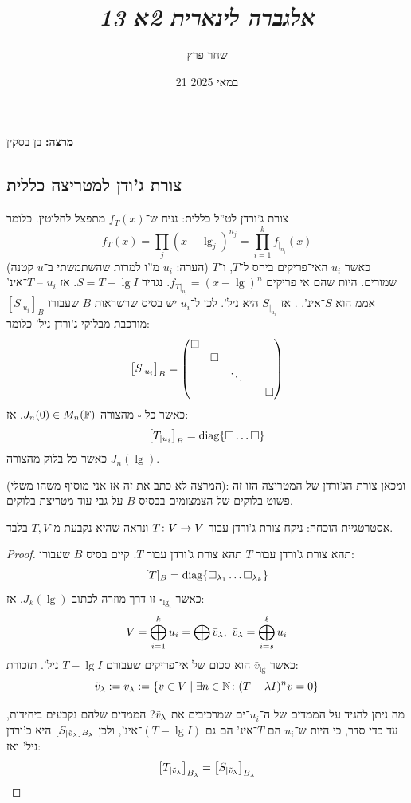 \documentclass[]{../../../../tex/classes/styledArticle}
\author{שחר פרץ}
\title{\textit{אלגברה לינארית 2א 13}}
\date{21 במאי 2025}
\begin{document}
    \maketitle
    \textbf{מרצה: }בן בסקין
    \subsection{צורת ג'ודן למטריצה כללית}
    
    צורת ג'ורדן לט''ל כללית: נניח ש־$f_T(x)$ מתפצל לחלוטין. כלומר
    \[ f_T(x) = \prod_{j}(x - \lg_j)^{n_j} = \prod_{i = 1}^{k}f_{|_{n_i}}(x) \]
    (הערה: $u_i$ מ''ו למרות שהשתמשתי ב־$u$ קטנה)
    כאשר $u_i$ האי־פריקים ביחס ל־$T$, ו־$T$ שמורים. היות שהם אי פריקים $f_{T|_{u_i}} = (x - \lg)^{n}$. נגדיר $S = T - \lg I$. אז $u_i$ – $T$־אינ' אממ הוא $S$־אינ'. 
    . אז $S_{|_{u_i}}$ היא ניל'. לכן ל־$u_i$ יש בסיס שרשראות $B$ שעבורו $[S_{|{u_i}}]_B$ מורכבת מבלוקי ג'ורדן ניל' כלומר: 
    \[ \left [ S_{|{u_i}} \right ]_B = \begin{pmatrix} \square \\ & \square \\ && \ddots \\ &&&& \square \end{pmatrix} \]
    כאשר כל $\square$ מהצורה $J_n(0) \in M_n(\mathbb{F})$. אז: 
    \[ \left [ T_{|{u_i}} \right ]_B = \operatorname{diag}\{\square \dots \square\} \]
    כאשר כל בלוק מהצורה $J_n(\lg)$. 
    
    (המרצה לא כתב את זה אז אני מוסיף משהו משלי): ומכאן צורת הג'ורדן של המטריצה הזו זה פשוט בלוקים של הצמצומים בבסיס $B$ על גבי עוד מטריצת בלוקים. 
    
    אסטרטגיית הוכחה: ניקח צורת ג'ורדן עבור $T \colon V \to V$ ונראה שהיא נקבעת מ־$T, V$ בלבד. 
    \begin{proof}
        תהא צורת ג'ורדן עבור $T$ תהא צורת ג'ורדן עבור $T$. קיים בסיס $B$ שעבורו: 
        \[ [T]_B = \operatorname{diag}\{\square_{\lambda_1} \dots \square_{\lambda_k}\} \]
        כאשר $\square_{\lg_i}$ זו דרך מוזרה לכתוב $J_k(\lg)$. 
        אז: 
        \[ V = \bigoplus_{i = 1}^{k} u_i = \bigoplus \bar v_{\lambda}, \ \bar v_{\lambda} = \bigoplus_{i = s}^{\ell} u_i \]
        כאשר $\bar v_{\lg}$ הוא סכום של אי־פריקים שעבורם $T - \lg I$ ניל'. תזכורת: 
        \[ \tilde v_{\lambda} := \bar v_{\lambda} := \{v \in V \mid \exists n \in \mathbb{N} \colon (T - \lambda I)^nv = 0\} \]
        
        מה ניתן להגיד על הממדים של ה־$u_i$־ים שמרכיבים את $\tilde v_\lambda$? הממדים שלהם נקבעים ביחידות, עד כדי סדר, כי היות ש־$u_i$ הם $T$־אינ' הם גם $(T - \lg I)$־אינ', ולכן $[S_{|\tilde v_\lambda}]_{B_\lambda}$ היא כ'ורדן ניל' ואז: 
        \[ \left [ T_{|\tilde v_\lambda} \right ]_{B_\lambda} = \left [ S_{|\tilde v_\lambda} \right ]_{B_\lambda} \]
    \end{proof}
    
\end{document}
